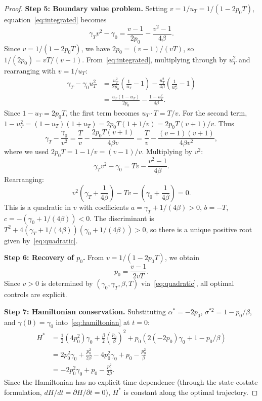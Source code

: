 \documentclass[12pt]{article}
\theoremstyle{definition}
\begin{document}
\begin{proof}
\medskip\noindent
\textbf{Step 5: Boundary value problem.}
Setting $v = 1/u_T = 1/(1 - 2p_0 T)$, equation~\eqref{eq:integrated}
becomes
\[
\gamma_T v^2 - \gamma_0 = \frac{v - 1}{2p_0} -
  \frac{v^2 - 1}{4\beta}.
\]
Since $v = 1/(1 - 2p_0 T)$, we have $2p_0 = (v-1)/(vT)$, so
$1/(2p_0) = vT/(v-1)$.
From~\eqref{eq:integrated}, multiplying through by $u_T^2$ and
rearranging with $v = 1/u_T$:
\begin{align*}
\gamma_T - \gamma_0 u_T^2
  &= \frac{u_T^2}{2p_0}\left(\frac{1}{u_T} - 1\right)
    - \frac{u_T^2}{4\beta}\left(\frac{1}{u_T^2} - 1\right) \\
  &= \frac{u_T(1 - u_T)}{2p_0} - \frac{1 - u_T^2}{4\beta}.
\end{align*}
Since $1 - u_T = 2p_0 T$, the first term becomes
$u_T \cdot T = T/v$.
For the second term, $1 - u_T^2 = (1 - u_T)(1 + u_T) =
2p_0 T(1 + 1/v) = 2p_0 T(v+1)/v$.
Thus
\[
\gamma_T - \frac{\gamma_0}{v^2} = \frac{T}{v}
  - \frac{2p_0 T(v+1)}{4\beta v}
  = \frac{T}{v} - \frac{(v-1)(v+1)}{4\beta v^2},
\]
where we used $2p_0 T = 1 - 1/v = (v-1)/v$.
Multiplying by $v^2$:
\[
\gamma_T v^2 - \gamma_0 = Tv - \frac{v^2 - 1}{4\beta}.
\]
Rearranging:
\begin{equation}\label{eq:bvp}
v^2\!\left(\gamma_T + \frac{1}{4\beta}\right) - Tv
  - \left(\gamma_0 + \frac{1}{4\beta}\right) = 0.
\end{equation}
This is a quadratic in $v$ with coefficients
$a = \gamma_T + 1/(4\beta) > 0$, $b = -T$,
$c = -(\gamma_0 + 1/(4\beta)) < 0$.
The discriminant is
$T^2 + 4(\gamma_T + 1/(4\beta))(\gamma_0 + 1/(4\beta)) > 0$,
so there is a unique positive root given by~\eqref{eq:quadratic}.

\medskip\noindent
\textbf{Step 6: Recovery of $p_0$.}
From $v = 1/(1 - 2p_0 T)$, we obtain
\begin{equation}\label{eq:p0}
p_0 = \frac{v - 1}{2vT}.
\end{equation}
Since $v > 0$ is determined by $(\gamma_0, \gamma_T, \beta, T)$
via~\eqref{eq:quadratic}, all optimal controls are explicit.

\medskip\noindent
\textbf{Step 7: Hamiltonian conservation.}
Substituting $\alpha^* = -2p_0$, $\sigma^{*2} = 1 - p_0/\beta$,
and $\gamma(0) = \gamma_0$ into~\eqref{eq:hamiltonian} at $t = 0$:
\begin{align*}
H^* &= \frac{1}{2}(4p_0^2)\gamma_0 + \frac{\beta}{2}
  \left(\frac{p_0}{\beta}\right)^2 + p_0(2(-2p_0)\gamma_0 +
  1 - p_0/\beta) \\
  &= 2p_0^2 \gamma_0 + \frac{p_0^2}{2\beta} - 4p_0^2\gamma_0
    + p_0 - \frac{p_0^2}{\beta} \\
  &= -2p_0^2\gamma_0 + p_0 - \frac{p_0^2}{2\beta}.
\end{align*}
Since the Hamiltonian has no explicit time dependence (through the
state-costate formulation, $dH/dt = \partial H/\partial t = 0$),
$H^*$ is constant along the optimal trajectory.
\end{proof}
\end{document}
